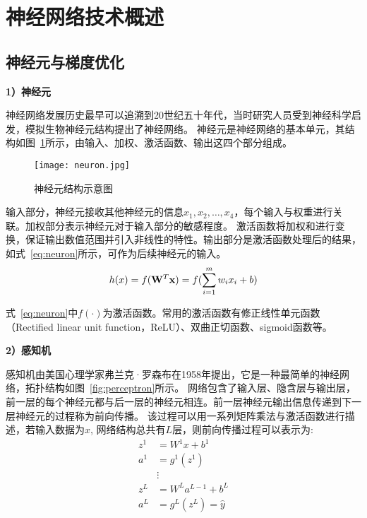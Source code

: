 \section{神经网络技术概述}
\subsection{神经元与梯度优化}

\textbf{1）神经元}

神经网络发展历史最早可以追溯到20世纪五十年代，当时研究人员受到神经科学启发，模拟生物神经元结构提出了神经网络。
神经元是神经网络的基本单元，其结构如图~\ref{fig:neuron}所示，由输入、加权、激活函数、输出这四个部分组成。
\begin{figure}
  \centering
  \texttt{[image: neuron.jpg]}
  \caption{神经元结构示意图}
  \label{fig:neuron}
\end{figure}

输入部分，神经元接收其他神经元的信息$x_1, x_2, \dots, x_4$，每个输入与权重进行关联。加权部分表示神经元对于输入部分的敏感程度。
激活函数将加权和进行变换，保证输出数值范围并引入非线性的特性。输出部分是激活函数处理后的结果，如式~\ref{eq:neuron}所示，可作为后续神经元的输入。
\begin{equation}
  h(x) = f({{\bf{W}}^T}{\bf{x}}) = f(\sum\limits_{i = 1}^m {{w_i}{x_i} + b})
  \label{eq:neuron}
\end{equation}

式~\ref{eq:neuron}中$f(\cdot)$为激活函数。常用的激活函数有修正线性单元函数（Rectified linear unit function，ReLU）、双曲正切函数、sigmoid函数等。

\textbf{2）感知机}

感知机由美国心理学家弗兰克·罗森布\cite{1958perceptron}在1958年提出，它是一种最简单的神经网络，拓扑结构如图~\ref{fig:perceptron}所示。
网络包含了输入层、隐含层与输出层，前一层的每个神经元都与后一层的神经元相连。前一层神经元输出信息传递到下一层神经元的过程称为前向传播。
该过程可以用一系列矩阵乘法与激活函数进行描述，若输入数据为$x$, 网络结构总共有$L$层，则前向传播过程可以表示为:
\begin{equation}
  \begin{aligned}
  z^{1} & =W^{1} x+b^{1} \\
  a^{1} & =g^{1}\left(z^{1}\right) \\
  & \vdots \\
  z^{L} & =W^{L} a^{L-1}+b^{L} \\
  a^{L} & =g^{L}\left(z^{L}\right)=\hat{y}
  \label{eq:perceptron}
\end{aligned}
\end{equation}


